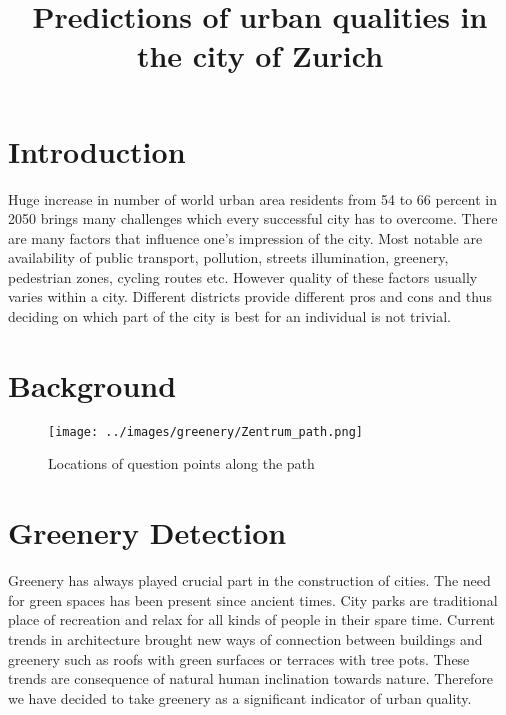 \documentclass[letterpaper]{article}
\title{Predictions of urban qualities in the city of Zurich}
\begin{document}
%
\maketitle
%

\begin{abstract}


\end{abstract}

\section{Introduction}\label{sec:intro}
Huge increase in number of world urban area residents from 54 to 66 percent in 2050 brings many challenges which every successful city has to overcome. 
There are many factors that influence one's impression of the city. Most notable are availability of public transport, pollution, streets illumination, greenery, pedestrian zones, cycling routes etc. However quality of these factors usually varies within a city. Different districts provide different pros and
cons and thus deciding on which part of the city is best for an individual is not trivial.

\section{Background}\label{sec:background}

 \begin{figure}
	\centering
	\texttt{[image: ../images/greenery/Zentrum\_path.png]}
	\caption{Locations of question points along the path}
	\label{fig:path_points}
\end{figure}

\section{Greenery Detection}\label{sec:greenery}

\indent Greenery has always played crucial part in the construction of cities. The need for green spaces has been present since ancient times. 
City parks are traditional place of recreation and relax for all kinds of people in their spare time. Current trends in architecture brought new ways of
connection between buildings and greenery such as roofs with green surfaces or terraces with tree pots. These trends are consequence of natural human inclination towards nature. Therefore we have decided to take greenery as a significant indicator of urban quality. 
\end{document}
